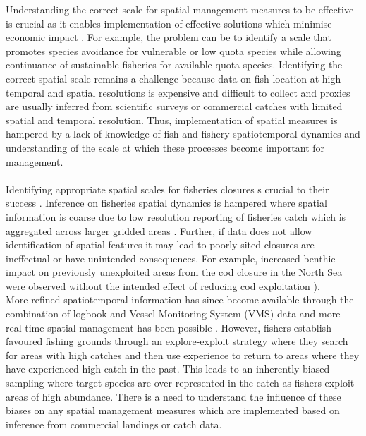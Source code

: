 \documentclass[review]{elsarticle}
\begin{document}
Understanding the correct scale for spatial management measures to be effective
is crucial as it enables implementation of effective solutions which minimise
economic impact \citep{Dunn2016}. For example, the problem can be to identify a
scale that promotes species avoidance for vulnerable or low quota species while
allowing continuance of sustainable fisheries for available quota species.
Identifying the correct spatial scale remains a challenge because data on fish
location at high temporal and spatial resolutions is expensive and difficult to
collect and proxies are usually inferred from scientific surveys or commercial
catches with limited spatial and temporal resolution. Thus, implementation of
spatial measures is hampered by a lack of knowledge of fish and fishery
spatiotemporal dynamics and understanding of the scale at which these processes
become important for management. \\ \\ 

Identifying appropriate spatial scales for fisheries closures s crucial to their success \citep{Costello2010, Dunn2016}.
Inference on fisheries spatial dynamics is hampered where spatial information
is coarse due to low resolution reporting of fisheries catch which is
aggregated across larger gridded areas \citep{Branch2005}. Further, if data
does not allow identification of spatial features it may lead to poorly sited
closures  are ineffectual or have unintended consequences. For example,
increased benthic impact on previously unexploited areas from the cod closure
in the North Sea were observed without the intended effect of reducing cod
exploitation \citep{Rijnsdorp2001,Dinmore2003}).\\ 

More refined spatiotemporal information has since become available through the
combination of logbook and Vessel Monitoring System (VMS) data \citep{Lee2010,
	Bastardie2010, Gerritsen2012, Mateo2016} and more real-time spatial
management has been possible \citep[e.g.][]{Holmes2011}.  However, fishers
establish favoured fishing grounds through an explore-exploit strategy
\citep{Rijnsdorp2011, Bailey2018} where they search for areas with high catches
and then use experience to return to areas where they have experienced high catch
in the past. This leads to an inherently biased sampling where target species
are over-represented in the catch as fishers exploit areas of high abundance.
There is a need to understand the influence of these biases on any spatial
management measures which are implemented based on inference from commercial
landings or catch data. \\ 
\end{document}
